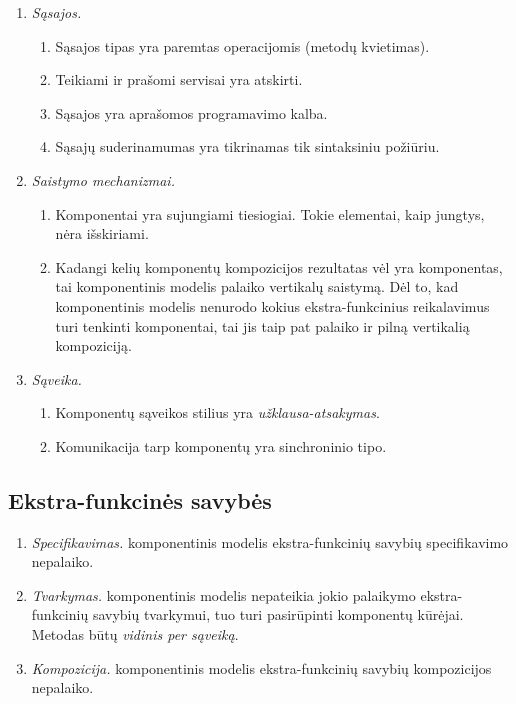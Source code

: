 \begin{enumerate}
  \item \emph{Sąsajos.}
    \begin{enumerate}
      \item Sąsajos tipas yra paremtas operacijomis (metodų kvietimas).
      \item Teikiami ir prašomi servisai yra atskirti.
      \item Sąsajos yra aprašomos  programavimo
        kalba.
      \item Sąsajų suderinamumas yra tikrinamas tik sintaksiniu
        požiūriu.
    \end{enumerate}
  \item \emph{Saistymo mechanizmai.}
    \begin{enumerate}
      \item Komponentai yra sujungiami tiesiogiai. Tokie elementai,
        kaip jungtys, nėra išskiriami.
      \item Kadangi kelių komponentų kompozicijos rezultatas vėl yra
        komponentas, tai  komponentinis modelis
        palaiko vertikalų saistymą. Dėl to, kad 
        komponentinis modelis nenurodo kokius ekstra-funkcinius
        reikalavimus turi tenkinti komponentai, tai jis taip pat
        palaiko ir pilną vertikalią kompoziciją.
    \end{enumerate}
  \item \emph{Sąveika.}
    \begin{enumerate}
      \item Komponentų sąveikos stilius yra \emph{užklausa-atsakymas}.
      \item Komunikacija tarp komponentų yra sinchroninio tipo.
    \end{enumerate}
\end{enumerate}

\subsection{Ekstra-funkcinės savybės}

\begin{enumerate}
  \item \emph{Specifikavimas.}
     komponentinis modelis ekstra-funkcinių savybių
    specifikavimo nepalaiko.
  \item \emph{Tvarkymas.}
     komponentinis modelis nepateikia jokio
    palaikymo ekstra-funkcinių savybių tvarkymui, tuo turi
    pasirūpinti komponentų kūrėjai. Metodas būtų \emph{vidinis
    per sąveiką}.
  \item \emph{Kompozicija.}
     komponentinis modelis ekstra-funkcinių savybių
    kompozicijos nepalaiko.
\end{enumerate}

